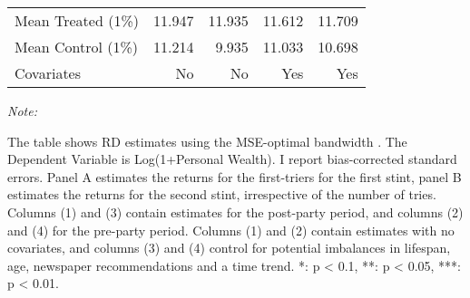 \begin{table}[!h]
\begin{threeparttable}
\begin{tabular}[t]{lrrrr}
\hspace{1em}Mean Treated (1\%) & 11.947 & 11.935 & 11.612 & 11.709\\
\hspace{1em}Mean Control (1\%) & 11.214 & 9.935 & 11.033 & 10.698\\
\hspace{1em}Covariates & No & No & Yes & Yes\\
\bottomrule
\end{tabular}
\begin{tablenotes}[para]
\item \textit{Note: } 
\item The table shows RD estimates using the MSE-optimal bandwidth \citep{cattaneo2019practical}. The Dependent Variable is Log(1+Personal Wealth). I report bias-corrected standard errors. Panel A estimates the returns for the first-triers for the first stint, panel B estimates the returns for the second stint, irrespective of the number of tries. Columns (1) and (3) contain estimates for the post-party period, and columns (2) and (4) for the pre-party period. Columns (1) and (2) contain estimates with no covariates, and columns (3) and (4) control for potential imbalances in lifespan, age, newspaper recommendations and a time trend. *: p < 0.1, **: p < 0.05, ***: p < 0.01.
\end{tablenotes}
\end{threeparttable}
\end{table}
